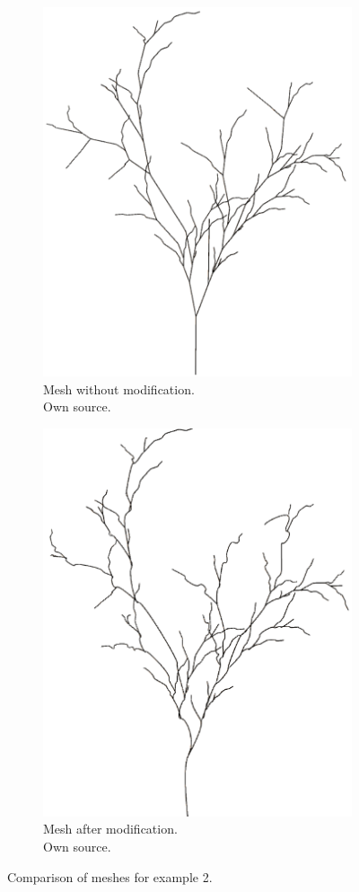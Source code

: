\documentclass[b5paper,twoside,11pt]{article}
\begin{document}
\begin{figure}[!htp]
\centering
\begin{subfigure}{.49\textwidth}
  \centering
  \includegraphics[width=0.8\linewidth]{przyklad2}
\caption{Mesh without modification.\\Own source. \label{przyklad2.siatka}}
\end{subfigure}
%
\begin{subfigure}{.49\textwidth}
  \centering
  \includegraphics[width=0.8\linewidth]{przyklad2MOD}
\caption{Mesh after modification.\\Own source. \label{przyklad2.siatkaMOD}}
\end{subfigure}
\caption{Comparison of meshes for example 2.}
\label{przyklad3}
\end{figure}
\newpage
\end{document}
